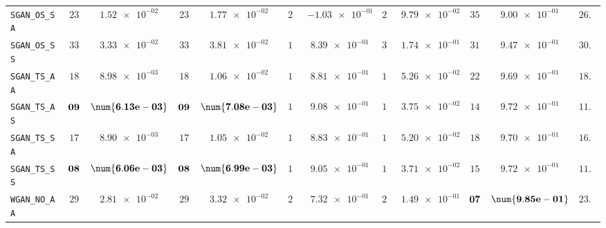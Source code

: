 \begin{xltabular}{\textwidth}{l||cC|cC|cC|cC|cC||c}
	\texttt{SGAN\_OS\_SA} & $ 23$ & $ \num{1.52e-02}$ & $ 23$ & $ \num{1.77e-02}$ & $ 29$ & $ \num{-1.03e-01}$ & $ 23$ & $ \num{9.79e-02}$ & $ 35$ & $ \num{9.00e-01}$ & $ 26.6$  \\
	\texttt{SGAN\_OS\_SS} & $ 33$ & $ \num{3.33e-02}$ & $ 33$ & $ \num{3.81e-02}$ & $ 19$ & $ \num{8.39e-01}$ & $ 34$ & $ \num{1.74e-01}$ & $ 31$ & $ \num{9.47e-01}$ & $ 30.0$  \\
	\texttt{SGAN\_TS\_AA} & $ 18$ & $ \num{8.98e-03}$ & $ 18$ & $ \num{1.06e-02}$ & $ 16$ & $ \num{8.81e-01}$ & $ 16$ & $ \num{5.26e-02}$ & $ 22$ & $ \num{9.69e-01}$ & $ 18.0$  \\
	\texttt{SGAN\_TS\_AS} & $\bf 09$ & $\bf \num{6.13e-03}$ & $\bf 09$ & $\bf \num{7.08e-03}$ & $ 13$ & $ \num{9.08e-01}$ & $ 12$ & $ \num{3.75e-02}$ & $ 14$ & $ \num{9.72e-01}$ & $ 11.4$  \\
	\texttt{SGAN\_TS\_SA} & $ 17$ & $ \num{8.90e-03}$ & $ 17$ & $ \num{1.05e-02}$ & $ 15$ & $ \num{8.83e-01}$ & $ 15$ & $ \num{5.20e-02}$ & $ 18$ & $ \num{9.70e-01}$ & $ 16.4$  \\
	\texttt{SGAN\_TS\_SS} & $\bf 08$ & $\bf \num{6.06e-03}$ & $\bf 08$ & $\bf \num{6.99e-03}$ & $ 14$ & $ \num{9.05e-01}$ & $ 11$ & $ \num{3.71e-02}$ & $ 15$ & $ \num{9.72e-01}$ & $ 11.2$  \\ \midrule
	\texttt{WGAN\_NO\_AA} & $ 29$ & $ \num{2.81e-02}$ & $ 29$ & $ \num{3.32e-02}$ & $ 25$ & $ \num{7.32e-01}$ & $ 29$ & $ \num{1.49e-01}$ & $\bf 07$ & $\bf \num{9.85e-01}$ & $ 23.8$  \\

\end{xltabular}
